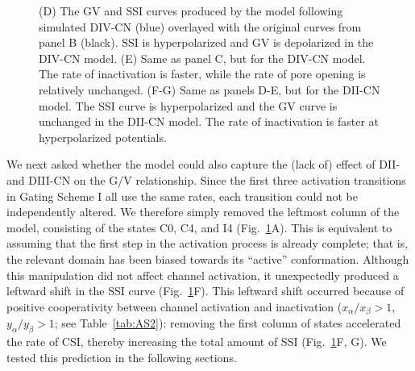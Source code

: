 \begin{figure}[t]
\begin{minipage}[c]{80mm}
{    (D) The GV and SSI curves produced by the model following simulated DIV-CN (blue) overlayed with the original curves from panel B (black). SSI is hyperpolarized and GV is depolarized in the DIV-CN model.
    (E) Same as panel C, but for the DIV-CN model. The rate of inactivation is faster, while the rate of pore opening is relatively unchanged. 
    (F-G) Same as panels D-E, but for the DII-CN model. The SSI curve is hyperpolarized and the GV curve is unchanged in the DII-CN model. The rate of inactivation is faster at hyperpolarized potentials.}
    \label{fig:A4}
\end{minipage}
\end{figure}

We next asked whether the model could also capture the (lack of) effect of DII- and DIII-CN on the G/V relationship. Since the first three activation transitions in Gating Scheme I all use the same rates, each transition could not be independently altered. We therefore simply removed the leftmost column of the model, consisting of the states C0, C4, and I4 (Fig.~\ref{fig:A4}A). This is equivalent to assuming that the first step in the activation process is already complete; that is, the relevant domain has been biased towards its “active” conformation. Although this manipulation did not affect channel activation, it unexpectedly produced a leftward shift in the SSI curve (Fig.~\ref{fig:A4}F). This leftward shift occurred because of positive cooperativity between channel activation and inactivation ($x_\alpha/x_\beta>1$, $y_\alpha/y_\beta>1$; see Table~\ref{tab:AS2}): removing the first column of states accelerated the rate of CSI, thereby increasing the total amount of SSI (Fig.~\ref{fig:A4}F, G). We tested this prediction in the following sections.
	
